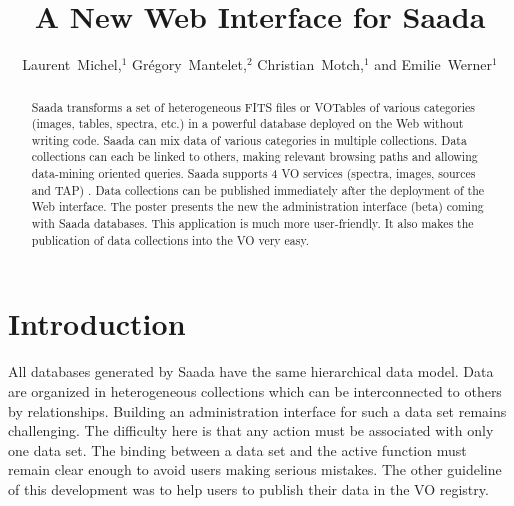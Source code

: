 
\resetcounters


\title{A New Web Interface for Saada}
\author{Laurent~Michel,$^1$ Gr\'egory~Mantelet,$^2$ Christian~Motch,$^1$ and Emilie~Werner$^1$
}


\begin{abstract}
Saada transforms a set of heterogeneous FITS files or VOTables of various categories (images, tables, spectra, etc.) in a powerful database deployed on the Web without writing code. Saada can mix data of various categories in multiple collections. Data collections can each be linked to others, making relevant browsing paths and allowing data-mining oriented queries. Saada supports 4 VO services (spectra, images, sources and TAP) . Data collections can be published immediately after the deployment of the Web interface. The poster presents the new the administration interface (beta) coming with Saada databases. This application is much more user-friendly. It also makes the publication of data collections into the VO very easy.
\end{abstract}

\section{Introduction}
All databases generated by Saada \citep{SAADA} have the same hierarchical data model. Data are organized in heterogeneous collections which can be interconnected to others by relationships. Building an administration interface for such a data set remains challenging. The difficulty here is that any action must be associated with only one data set. The binding between a data set and the active function must remain clear enough to avoid users making serious mistakes. The other guideline of this development was to help users to publish their data in the VO registry.

